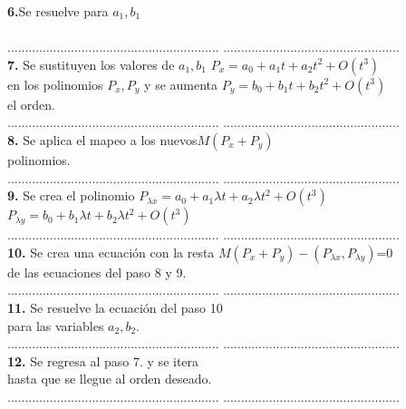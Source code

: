 \begin{center}
\begin{tabbing}
		\>\textbf{6.}Se resuelve para $a_{1},b_{1}$\\
		\> \> \\
		\>............................................................  \>..................................................\\
		\> \textbf{7. }Se sustituyen los valores de $a_{1},b_{1}$ \> $P_{x} = a_{0}+a_{1}t+a_{2}t^{2}+O(t^{3})$\\
		\> en los polinomios $P_{x},P_{y}$ y se aumenta\>  $P_{y} = b_{0} +b_{1}t +b_{2}t^{2}+O(t^{3})$\\
		\>  el orden.\> \\
		\>............................................................  \>..................................................\\
		\>\textbf{8.} Se aplica el mapeo a los nuevos\>$M(P_{x}+P_{y})$ \\
		\> polinomios.\>\\
		\>............................................................  \>..................................................\\
		\>\textbf{9.} Se crea el polinomio \> $P_{\lambda x} = a_{0}+a_{1}\lambda t+a_{2}\lambda t^{2}+O(t^{3})$\\
		\> \>$P_{\lambda y} = b_{0}+b_{1}\lambda t+b_{2}\lambda t^{2}+O(t^{3})$\\
		\>............................................................  \>..................................................\\
		\>\textbf{10.} Se crea una ecuación con la resta \> $M(P_{x}+P_{y}) -(P_{\lambda x},P_{\lambda y})$=0 \\
		\> de las ecuaciones del paso 8 y 9.\> \\
		\>............................................................  \>..................................................\\
		\> \textbf{11.} Se resuelve la ecuación del paso 10 \>  \\
		\> para las variables $a_{2},b_{2}$. \>\\
		\>............................................................  \>..................................................\\
		\> \textbf{12.} Se regresa al paso 7. y se itera\> \\
		\> hasta que se llegue al orden deseado. \> \\
		\>............................................................  \>..................................................\\
		
		
		
		
	\end{tabbing} 
\end{center}


